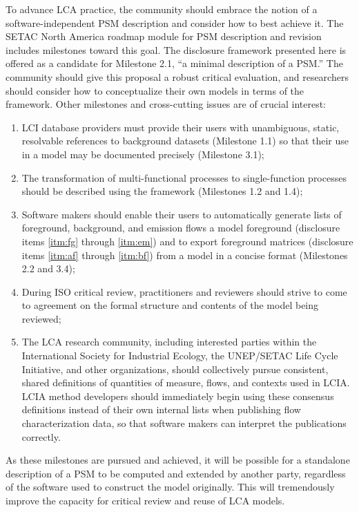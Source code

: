 To advance LCA practice, the community should embrace the notion of a software-independent PSM description and consider how to best achieve it.  The SETAC North America roadmap module for PSM description and revision \citep{Kuczenski_JLCA_2018} includes milestones toward this goal.  The disclosure framework presented here is offered as a candidate for Milestone 2.1, ``a minimal description of a PSM.''  The community should give this proposal a robust critical evaluation, and researchers should consider how to conceptualize their own models in terms of the framework.  Other milestones and cross-cutting issues are of crucial interest:
\begin{enumerate}[label=(\alph*)]
\item LCI database providers must provide their users with unambiguous, static, resolvable references to background datasets (Milestone 1.1) so that their use in a model may be documented precisely (Milestone 3.1);
\item The transformation of multi-functional processes to single-function processes should be described using the framework (Milestones 1.2 and 1.4);
\item Software makers should enable their users to automatically generate lists of foreground, background, and emission flows a model foreground (disclosure items \ref{itm:fg} through \ref{itm:em}) and to export foreground matrices (disclosure items \ref{itm:af} through \ref{itm:bf}) from a model in a concise format (Milestones 2.2 and 3.4);
\item During ISO critical review, practitioners and reviewers should strive to come to agreement on the formal structure and contents of the model being reviewed;
\item The LCA research community, including interested parties within the International Society for Industrial Ecology, the UNEP/SETAC Life Cycle Initiative, and other organizations, should collectively pursue consistent, shared definitions of quantities of measure, flows, and contexts used in LCIA.  %
LCIA method developers should immediately begin using these consensus definitions instead of their own internal lists when publishing flow characterization data, so that software makers can interpret the publications correctly.  %
\end{enumerate}
As these milestones are pursued and achieved, it will be possible for a standalone description of a PSM to be computed and extended by another party, regardless of the software used to construct the model originally.  This will tremendously improve the capacity for critical review and reuse of LCA models.

